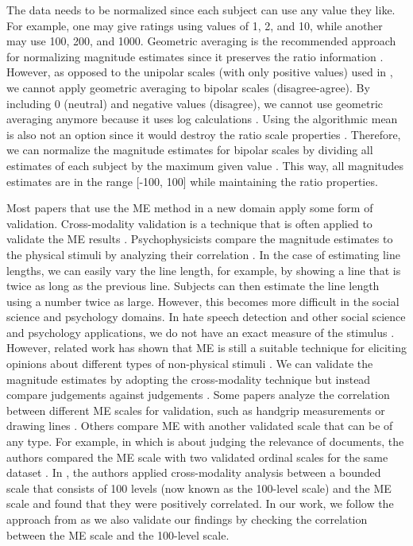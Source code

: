 %
The data needs to be normalized since each subject can use any value they like.
%
For example, one may give ratings using values of 1, 2, and 10, while another may use 100, 200, and 1000.
%
Geometric averaging is the recommended approach for normalizing magnitude estimates since it preserves the ratio information \citep{moskowitz1977magnitude, mcgee2004master, maddalena2017crowdsourcing}.
%
However, as opposed to the unipolar scales (with only positive values) used in \citet{bard1996magnitude, mcgee2004master, maddalena2017crowdsourcing}, we cannot apply geometric averaging to bipolar scales (disagree-agree).
%
By including 0 (neutral) and negative values (disagree), we cannot use geometric averaging anymore because it uses log calculations \citep{moskowitz1977magnitude}.
%
Using the algorithmic mean is also not an option since it would destroy the ratio scale properties \citep{moskowitz1977magnitude}.
%
Therefore, we can normalize the magnitude estimates for bipolar scales by dividing all estimates of each subject by the maximum given value \citep{moskowitz1977magnitude}.
%
This way, all magnitudes estimates are in the range [-100, 100] while maintaining the ratio properties.
%

%
Most papers that use the ME method in a new domain apply some form of validation. Cross-modality validation is a technique that is often applied to validate the ME results \citep{bard1996magnitude}.
%
Psychophysicists compare the magnitude estimates to the physical stimuli by analyzing their correlation \citep{bard1996magnitude}.
%
In the case of estimating line lengths, we can easily vary the line length, for example, by showing a line that is twice as long as the previous line.
%
Subjects can then estimate the line length using a number twice as large.
%
However, this becomes more difficult in the social science and psychology domains.
%
In hate speech detection and other social science and psychology applications, we do not have an exact measure of the stimulus \citep{bard1996magnitude}.
%
However, related work has shown that ME is still a suitable technique for eliciting opinions about different types of non-physical stimuli \citep{bard1996magnitude, mcgee2004master, maddalena2017crowdsourcing, lodge1979comparisons}.
%
We can validate the magnitude estimates by adopting the cross-modality technique but instead compare judgements against judgements \citep{bard1996magnitude, lodge1979comparisons}.
%
Some papers analyze the correlation between different ME scales for validation, such as handgrip measurements or drawing lines \citep{bard1996magnitude, lodge1976calibration}.
%
Others compare ME with another validated scale that can be of any type.
%
For example, in \cite{maddalena2017crowdsourcing} which is about judging the relevance of documents, the authors compared the ME scale with two validated ordinal scales for the same dataset \citep{maddalena2017crowdsourcing}.
%
In \citet{roitero2018fine}, the authors applied cross-modality analysis between a bounded scale that consists of 100 levels (now known as the 100-level scale) and the ME scale and found that they were positively correlated.
%
In our work, we follow the approach from \citet{roitero2018fine} as we also validate our findings by checking the correlation between the ME scale and the 100-level scale.
%

